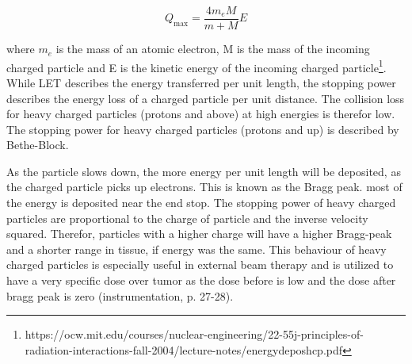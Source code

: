 \documentclass[a4paper,11pt,twoside]{book}
\begin{document}
\begin{equation} \label{eq:collision_E_transfer}
    Q_\text{max}=\frac{4m_eM}{m+M}E
\end{equation}

where $m_e$ is the mass of an atomic electron, M is the mass of the incoming charged particle and E is the kinetic energy of the incoming charged particle\footnote{https://ocw.mit.edu/courses/nuclear-engineering/22-55j-principles-of-radiation-interactions-fall-2004/lecture-notes/energydeposhcp.pdf}. While LET describes the energy transferred per unit length, the stopping power describes the energy loss of a charged particle per unit distance. The collision loss for heavy charged particles (protons and above) at high energies is therefor low. The stopping power for heavy charged particles (protons and up) is described by Bethe-Block.

 As the particle slows down, the more energy per unit length will be deposited, as the charged particle picks up electrons. This is known as the Bragg peak. most of the energy is deposited near the end stop. The stopping power of heavy charged particles are proportional to the charge of particle and the inverse velocity squared. Therefor, particles with a higher charge will have a higher Bragg-peak and a shorter range in tissue, if energy was the same. This behaviour of heavy charged particles is especially useful in external beam therapy and is utilized to have a very specific dose over tumor as the dose before is low and the dose after bragg peak is zero (instrumentation, p. 27-28). \\
\end{document}
